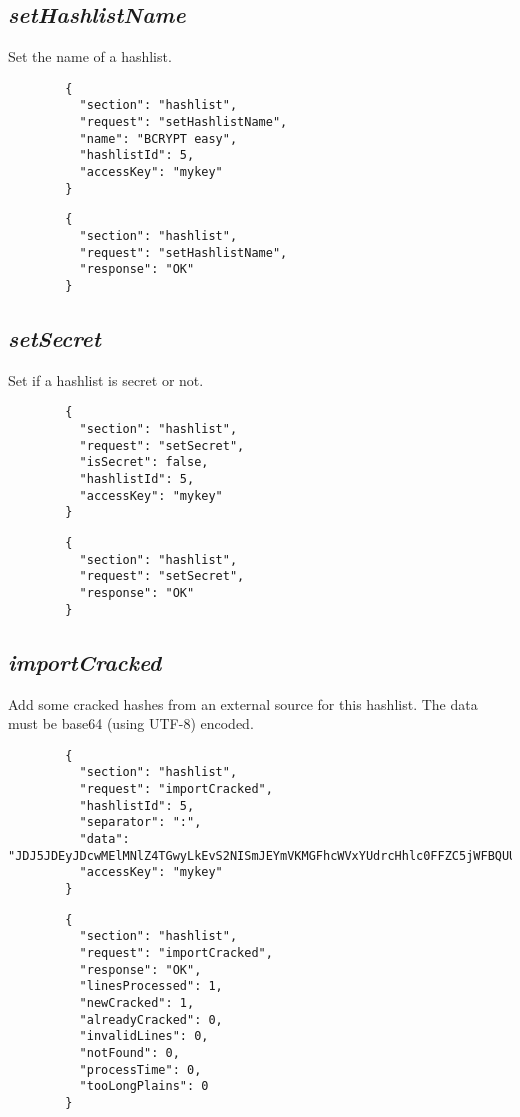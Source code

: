\subsection*{\textit{setHashlistName}}
	Set the name of a hashlist.
	{
		\color{blue}
		\begin{verbatim}
		{
		  "section": "hashlist",
		  "request": "setHashlistName",
		  "name": "BCRYPT easy",
		  "hashlistId": 5,
		  "accessKey": "mykey"
		}
		\end{verbatim}
	}
	{
		\color{OliveGreen}
		\begin{verbatim}
		{
		  "section": "hashlist",
		  "request": "setHashlistName",
		  "response": "OK"
		}
		\end{verbatim}
	}
\subsection*{\textit{setSecret}}
	Set if a hashlist is secret or not.
	{
		\color{blue}
		\begin{verbatim}
		{
		  "section": "hashlist",
		  "request": "setSecret",
		  "isSecret": false,
		  "hashlistId": 5,
		  "accessKey": "mykey"
		}
		\end{verbatim}
	}
	{
		\color{OliveGreen}
		\begin{verbatim}
		{
		  "section": "hashlist",
		  "request": "setSecret",
		  "response": "OK"
		}
		\end{verbatim}
	}
\subsection*{\textit{importCracked}}
	Add some cracked hashes from an external source for this hashlist. The data must be base64 (using UTF-8) encoded.
	{
		\color{blue}
		\begin{verbatim}
		{
		  "section": "hashlist",
		  "request": "importCracked",
		  "hashlistId": 5,
		  "separator": ":",
		  "data": "JDJ5JDEyJDcwMElMNlZ4TGwyLkEvS2NISmJEYmVKMGFhcWVxYUdrcHhlc0FFZC5jWFBQUU4vWjNVN1c2OnRlc3Q=",
		  "accessKey": "mykey"
		}
		\end{verbatim}
	}
	{
		\color{OliveGreen}
		\begin{verbatim}
		{
		  "section": "hashlist",
		  "request": "importCracked",
		  "response": "OK",
		  "linesProcessed": 1,
		  "newCracked": 1,
		  "alreadyCracked": 0,
		  "invalidLines": 0,
		  "notFound": 0,
		  "processTime": 0,
		  "tooLongPlains": 0
		}
		\end{verbatim}
	}

